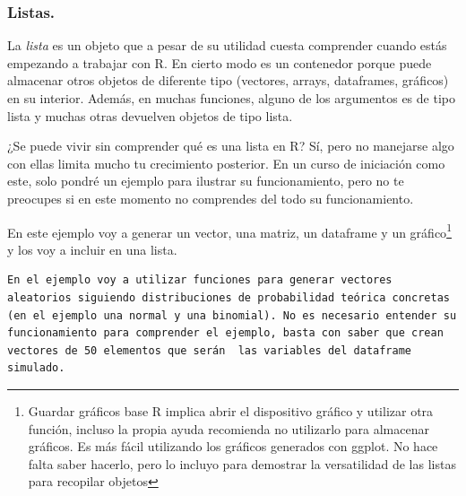 \documentclass[
  letterpaper,
  DIV=11,
  numbers=noendperiod]{scrreprt}
\begin{document}
\hypertarget{listas.}{%
\subsubsection{Listas.}\label{listas.}}

La \emph{lista} es un objeto que a pesar de su utilidad cuesta
comprender cuando estás empezando a trabajar con R. En cierto modo es un
contenedor porque puede almacenar otros objetos de diferente tipo
(vectores, arrays, dataframes, gráficos) en su interior. Además, en
muchas funciones, alguno de los argumentos es de tipo lista y muchas
otras devuelven objetos de tipo lista.

¿Se puede vivir sin comprender qué es una lista en R? Sí, pero no
manejarse algo con ellas limita mucho tu crecimiento posterior. En un
curso de iniciación como este, solo pondré un ejemplo para ilustrar su
funcionamiento, pero no te preocupes si en este momento no comprendes
del todo su funcionamiento.

En este ejemplo voy a generar un vector, una matriz, un dataframe y un
gráfico\footnote{Guardar gráficos base R implica abrir el dispositivo
  gráfico y utilizar otra función, incluso la propia ayuda recomienda no
  utilizarlo para almacenar gráficos. Es más fácil utilizando los
  gráficos generados con ggplot. No hace falta saber hacerlo, pero lo
  incluyo para demostrar la versatilidad de las listas para recopilar
  objetos} y los voy a incluir en una lista.

\begin{verbatim}
En el ejemplo voy a utilizar funciones para generar vectores aleatorios siguiendo distribuciones de probabilidad teórica concretas (en el ejemplo una normal y una binomial). No es necesario entender su funcionamiento para comprender el ejemplo, basta con saber que crean vectores de 50 elementos que serán  las variables del dataframe simulado.
\end{verbatim}
\end{document}
